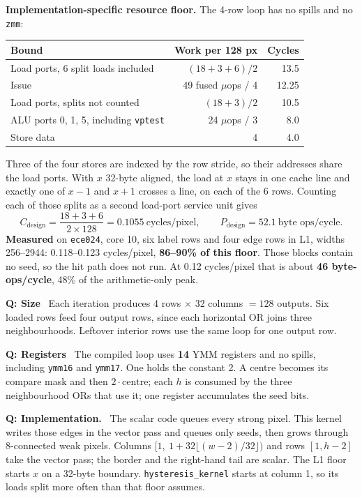 \documentclass[10pt]{article}
\makeatletter
\renewcommand\subsection{\@startsection{subsection}{2}{\z@}{7pt}{2pt}{\normalsize\bfseries}}
\newcommand{\Q}[1]{\textbf{Q: #1}\ }
\makeatother
\begin{document}
\textbf{Implementation-specific resource floor.} The 4-row loop has no spills and no \texttt{zmm}:
\begin{center}\small
\begin{tabular}{lrr}
\toprule
Bound & Work per 128 px & Cycles \\
\midrule
Load ports, 6 split loads included & $(18+3+6)/2$ & 13.5 \\
Issue & 49 fused $\mu$ops / 4 & 12.25 \\
Load ports, splits not counted & $(18+3)/2$ & 10.5 \\
ALU ports 0, 1, 5, including \texttt{vptest} & 24 $\mu$ops / 3 & 8.0 \\
Store data & 4 & 4.0 \\
\bottomrule
\end{tabular}
\end{center}
Three of the four stores are indexed by the row stride, so their addresses share the load ports. With $x$ 32-byte aligned, the load at $x$ stays in one cache line and exactly one of $x-1$ and $x+1$ crosses a line, on each of the 6 rows. Counting each of those splits as a second load-port service unit gives
\[
C_{\mathrm{design}}=\frac{18+3+6}{2\times 128}=\boxed{0.1055\ \text{cycles/pixel}},\qquad
P_{\mathrm{design}}=\boxed{52.1\ \text{byte ops/cycle}}.
\]
\textbf{Measured} on \texttt{ece024}, core 10, six label rows and four edge rows in L1, widths 256--2944: 0.118--0.123 cycles/pixel, \textbf{86--90\% of this floor}. Those blocks contain no seed, so the hit path does not run. At 0.12 cycles/pixel that is about \textbf{46 byte-ops/cycle}, 48\% of the arithmetic-only peak.

\subsection{Design and Implementation}\label{sec:hyst-design}
\Q{Size} Each iteration produces 4 rows $\times$ 32 columns $=128$ outputs. Six loaded rows feed four output rows, since each horizontal OR joins three neighbourhoods. Leftover interior rows use the same loop for one output row.

\Q{Registers} The compiled loop uses \textbf{14} YMM registers and no spills, including \texttt{ymm16} and \texttt{ymm17}. One holds the constant 2. A centre becomes its compare mask and then $2\cdot\mathrm{centre}$; each $h$ is consumed by the three neighbourhood ORs that use it; one register accumulates the seed bits.

\Q{Implementation.} The scalar code queues every strong pixel. This kernel writes those edges in the vector pass and queues only seeds, then grows through 8-connected weak pixels. Columns $[1,\ 1+32\lfloor(w-2)/32\rfloor)$ and rows $[1,h-2]$ take the vector pass; the border and the right-hand tail are scalar. The L1 floor starts $x$ on a 32-byte boundary. \texttt{hysteresis\_kernel} starts at column 1, so its loads split more often than that floor assumes.
\end{document}
